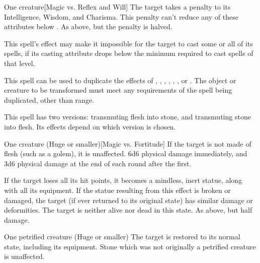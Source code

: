 \spelldur{\durshort}
\begin{spelltarget}{One creature}[Magic vs. Reflex and Will]
    \spellsuccess[Reflex] The target takes a  penalty to its Intelligence, Wisdom, and Charisma. This penalty can't reduce any of these attributes below .
    \spellfailure[Will] As above, but the penalty is halved.
\end{spelltarget}
\spellnotes This spell's effect may make it impossible for the target to cast some or all of its spells, if its casting attribute drops below the minimum required to cast spells of that level.

\spellrng{\rngmed}
\spellspecial This spell can be used to duplicate the effects of , , , , , , or . The object or creature to be transformed must meet any requirements of the spell being duplicated, other than range.

\spellrng{\rngmed}
\spellspecial This spell has two versions: transmuting flesh into stone, and transmuting stone into flesh. Its effects depend on which version is chosen.
\begin{spelltarget}{One creature (Huge or smaller)}[Magic vs. Fortitude]
    \spellspecial If the target is not made of flesh (such as a golem), it is unaffected.
    \spellsuccess 6d6 physical damage immediately, and 3d6 physical damage at the end of each round after the first.

    If the target loses all its hit points, it becomes a mindless, inert statue, along with all its equipment. If the statue resulting from this effect is broken or damaged, the target (if ever returned to its original state) has similar damage or deformities. The target is neither alive nor dead in this state.
    \spellfailure As above, but half damage.
\end{spelltarget}

\begin{spelltarget}{One petrified creature (Huge or smaller)}
    \spellsuccess The target is restored to its normal state, including its equipment. Stone which was not originally a petrified creature is unaffected.
\end{spelltarget}


